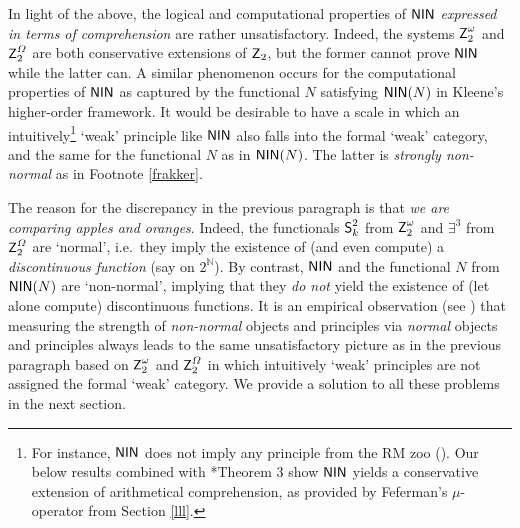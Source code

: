 \documentclass[reqno]{amsart}
\def\Z{\textup{\textsf{Z}}}
\def\N{{\mathbb  N}}
\def\NIN{\textup{\textsf{NIN}}}
\def\SS{\textup{\textsf{S}}}
\numberwithin{equation}{section}
\numberwithin{thm}{section}
\begin{document}
In light of the above, the logical and computational properties of $\NIN$ \emph{expressed in terms of comprehension} are rather unsatisfactory.  
Indeed, the systems $\Z_{2}^{\omega}$ and $\Z_{2}^{\Omega}$ are both conservative extensions of $\Z_{2}$, but the former cannot prove $\NIN$ while the latter can. 
A similar phenomenon occurs for the computational properties of $\NIN$ as captured by the functional $N$ satisfying $\NIN(N)$ in Kleene's higher-order framework.  
It would be desirable to have a scale in which an intuitively\footnote{For instance, $\NIN$ does not imply any principle from the RM zoo (\cite{damirzoo}).  Our below results combined with \cite{kruisje}*{Theorem 3} show $\NIN$ yields a conservative extension of arithmetical comprehension, as provided by Feferman's $\mu$-operator from Section \ref{lll}.} `weak' principle like $\NIN$ also falls into the formal `weak' category, and the same for the functional $N$ as in $\NIN(N)$.  The latter is \emph{strongly non-normal} as in Footnote \ref{frakker}.

\smallskip

The reason for the discrepancy in the previous paragraph is that \emph{we are comparing apples and oranges}.  
Indeed, the functionals $\SS_{k}^{2}$ from $\Z_{2}^{\omega}$ and $\exists^{3}$ from $\Z_{2}^{\Omega}$ are `normal', i.e.\ they imply the existence of (and even compute) a \emph{discontinuous function} (say on $2^{\N}$).  By contrast, $\NIN$ and the functional $N$ from $\NIN(N)$ are `non-normal', implying that they \emph{do not} yield the existence of (let alone compute) discontinuous functions.   
It is an empirical observation (see \cites{dagsam, dagsamII, dagsamIII, dagsamV, dagsamVI, dagsamVII}) that measuring the strength of \emph{non-normal} objects and principles via \emph{normal} objects and principles always leads to the same unsatisfactory picture as in the previous paragraph based on $\Z_{2}^{\omega}$ and $\Z_{2}^{\Omega}$ in which intuitively `weak' principles are not assigned the formal `weak' category.  We provide a solution to all these problems in the next section. 
\end{document}
